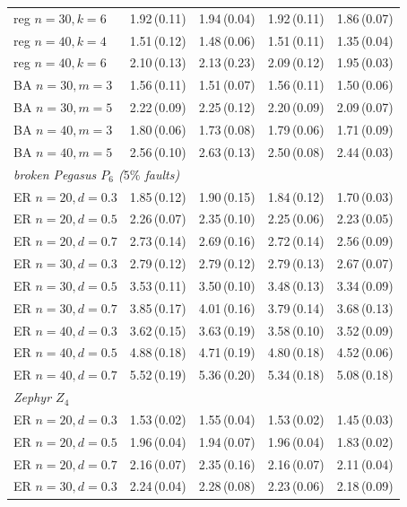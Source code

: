 \documentclass[acmsmall,anonymous,nonacm]{acmart}
\begin{document}
\begin{table}[h]
\begin{tabular}{lcccc}
reg $n{=}30,k{=}6$ & 1.92\,(0.11) & 1.94\,(0.04) & 1.92\,(0.11) & 1.86\,(0.07) \\
reg $n{=}40,k{=}4$ & 1.51\,(0.12) & 1.48\,(0.06) & 1.51\,(0.11) & 1.35\,(0.04) \\
reg $n{=}40,k{=}6$ & 2.10\,(0.13) & 2.13\,(0.23) & 2.09\,(0.12) & 1.95\,(0.03) \\
BA $n{=}30,m{=}3$ & 1.56\,(0.11) & 1.51\,(0.07) & 1.56\,(0.11) & 1.50\,(0.06) \\
BA $n{=}30,m{=}5$ & 2.22\,(0.09) & 2.25\,(0.12) & 2.20\,(0.09) & 2.09\,(0.07) \\
BA $n{=}40,m{=}3$ & 1.80\,(0.06) & 1.73\,(0.08) & 1.79\,(0.06) & 1.71\,(0.09) \\
BA $n{=}40,m{=}5$ & 2.56\,(0.10) & 2.63\,(0.13) & 2.50\,(0.08) & 2.44\,(0.03) \\
\midrule
\multicolumn{5}{l}{\emph{broken Pegasus $P_6$ ($5\%$ faults)}}\\
\midrule
ER $n{=}20,d{=}0.3$ & 1.85\,(0.12) & 1.90\,(0.15) & 1.84\,(0.12) & 1.70\,(0.03) \\
ER $n{=}20,d{=}0.5$ & 2.26\,(0.07) & 2.35\,(0.10) & 2.25\,(0.06) & 2.23\,(0.05) \\
ER $n{=}20,d{=}0.7$ & 2.73\,(0.14) & 2.69\,(0.16) & 2.72\,(0.14) & 2.56\,(0.09) \\
ER $n{=}30,d{=}0.3$ & 2.79\,(0.12) & 2.79\,(0.12) & 2.79\,(0.13) & 2.67\,(0.07) \\
ER $n{=}30,d{=}0.5$ & 3.53\,(0.11) & 3.50\,(0.10) & 3.48\,(0.13) & 3.34\,(0.09) \\
ER $n{=}30,d{=}0.7$ & 3.85\,(0.17) & 4.01\,(0.16) & 3.79\,(0.14) & 3.68\,(0.13) \\
ER $n{=}40,d{=}0.3$ & 3.62\,(0.15) & 3.63\,(0.19) & 3.58\,(0.10) & 3.52\,(0.09) \\
ER $n{=}40,d{=}0.5$ & 4.88\,(0.18) & 4.71\,(0.19) & 4.80\,(0.18) & 4.52\,(0.06) \\
ER $n{=}40,d{=}0.7$ & 5.52\,(0.19) & 5.36\,(0.20) & 5.34\,(0.18) & 5.08\,(0.18) \\
\midrule
\multicolumn{5}{l}{\emph{Zephyr $Z_4$}}\\
\midrule
ER $n{=}20,d{=}0.3$ & 1.53\,(0.02) & 1.55\,(0.04) & 1.53\,(0.02) & 1.45\,(0.03) \\
ER $n{=}20,d{=}0.5$ & 1.96\,(0.04) & 1.94\,(0.07) & 1.96\,(0.04) & 1.83\,(0.02) \\
ER $n{=}20,d{=}0.7$ & 2.16\,(0.07) & 2.35\,(0.16) & 2.16\,(0.07) & 2.11\,(0.04) \\
ER $n{=}30,d{=}0.3$ & 2.24\,(0.04) & 2.28\,(0.08) & 2.23\,(0.06) & 2.18\,(0.09) \\

\end{tabular}
\end{table}
\end{document}
